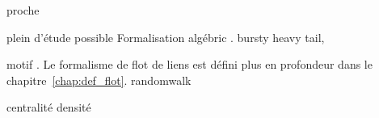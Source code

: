 proche\cite{Matias2015}

\cite{Holme2013a,Holme2015b,Holme2015} plein d'étude possible
Formalisation algébric \cite{Batagelj2015}.
bursty \cite{Karsai2012a,Karsai2011,Moinet2015,Stehle2010} \cite{Malmgren2008,Malmgren2009} heavy tail, \cite{Rocha2013}

motif \cite{Kovanen2011a,Kovanen2013}.
Le formalisme de flot de liens est défini plus en profondeur dans le chapitre~\ref{chap:def_flot}.
randomwalk\cite{Starnini2012b}

\cite{Gaumont2016}
centralité \cite{Costa2015,Kim2012, Pfitzner2013a, Praprotnik2015,Scholtes2015,Takaguchi2016}
densité \cite{Viard2014a}



